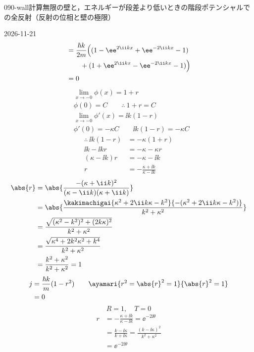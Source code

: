 \documentclass[uplatex,dvipdfmx,a4paper,11pt]{jsarticle}
\begin{document}
\begin{mondai}{090-wall}{計算}{無限の壁と，エネルギーが段差より低いときの階段ポテンシャルでの全反射（反射の位相と壁の極限）}
\begin{kotaeutsushi}{2026-11-21}
\begin{align*}
&=\frac{\hbar k}{2m}\Bigl((1-\ee^{2\ii kx}+\ee^{-2\ii kx}-1)\\
&\qquad+(1+\ee^{2\ii kx}-\ee^{-2\ii kx}-1)\Bigr)\\
&=0
\end{align*}
\begin{align*}
&\lim_{x\to-0}\phi(x)=1+r\\
&\phi(0)=C\qquad\therefore\ 1+r=C\\
&\lim_{x\to-0}\phi'(x)=\ii k(1-r)\\
&\phi'(0)=-\kappa C\qquad\ii k(1-r)=-\kappa C
\end{align*}
\begin{align*}
\therefore\ \ii k(1-r)&=-\kappa(1+r)\\
\ii k-\ii kr&=-\kappa-\kappa r\\
(\kappa-\ii k)r&=-\kappa-\ii k\\
r&=-\frac{\kappa+\ii k}{\kappa-\ii k}
\end{align*}
\begin{align*}
\abs{r}&=\abs{\frac{-(\kappa+\ii k)^{2}}{(\kappa-\ii k)(\kappa+\ii k)}}\\
&=\abs{\frac{\kakimachigai{\kappa^{2}+2\ii k\kappa-k^{2}}{-(\kappa^{2}+2\ii k\kappa-k^{2})}}{k^{2}+\kappa^{2}}}\\
&=\frac{\sqrt{(\kappa^{2}-k^{2})^{2}+(2k\kappa)^{2}}}{k^{2}+\kappa^{2}}\\
&=\frac{\sqrt{\kappa^{4}+2k^{2}\kappa^{2}+k^{4}}}{k^{2}+\kappa^{2}}\\
&=\frac{k^{2}+\kappa^{2}}{k^{2}+\kappa^{2}}=1
\end{align*}
\begin{align*}
j&=\frac{\hbar k}{m}(1-r^{2})\qquad\ayamari{r^{2}=\abs{r}^{2}=1}{\abs{r}^{2}=1}\\
&=0
\end{align*}
\[ R=1,\quad T=0 \]
\begin{align*}
r&=-\frac{\kappa+\ii k}{\kappa-\ii k}=\ee^{-2\ii\theta}\\
&=\frac{k-\ii\kappa}{k+\ii\kappa}=\frac{(k-\ii\kappa)^{2}}{k^{2}+\kappa^{2}}\\
&=\ee^{-2\ii\theta}
\end{align*}
\begin{align*}

\end{align*}
\end{kotaeutsushi}
\end{mondai}
\end{document}
